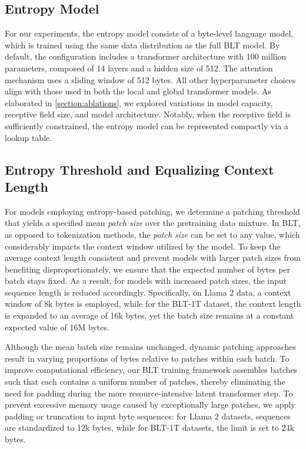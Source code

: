 \subsection{Entropy Model} For our experiments, the entropy model consists of a byte-level language model, which is trained using the same data distribution as the full {\textsc BLT} model. By default, the configuration includes a transformer architecture with 100 million parameters, composed of 14 layers and a hidden size of 512. The attention mechanism uses a sliding window of 512 bytes. All other hyperparameter choices align with those used in both the local and global transformer models. As elaborated in \autoref{section:ablations}, we explored variations in model capacity, receptive field size, and model architecture. Notably, when the receptive field is sufficiently constrained, the entropy model can be represented compactly via a lookup table.

\subsection{Entropy Threshold and Equalizing Context Length} For models employing entropy-based patching, we determine a patching threshold that yields a specified mean \textit{patch size} over the pretraining data mixture. In {\textsc BLT}, as opposed to tokenization methods, the \textit{patch size} can be set to any value, which considerably impacts the context window utilized by the model. To keep the average context length consistent and prevent models with larger patch sizes from benefiting disproportionately, we ensure that the expected number of bytes per batch stays fixed. As a result, for models with increased patch sizes, the input sequence length is reduced accordingly. Specifically, on Llama 2 data, a context window of 8k bytes is employed, while for the {\textsc BLT}-1T dataset, the context length is expanded to an average of 16k bytes, yet the batch size remains at a constant expected value of 16M bytes.

Although the mean batch size remains unchanged, dynamic patching approaches result in varying proportions of bytes relative to patches within each batch. To improve computational efficiency, our {\textsc BLT} training framework assembles batches such that each contains a uniform number of patches, thereby eliminating the need for padding during the more resource-intensive latent transformer step. To prevent excessive memory usage caused by exceptionally large patches, we apply padding or truncation to input byte sequences: for Llama 2 datasets, sequences are standardized to 12k bytes, while for {\textsc BLT}-1T datasets, the limit is set to 24k bytes.

